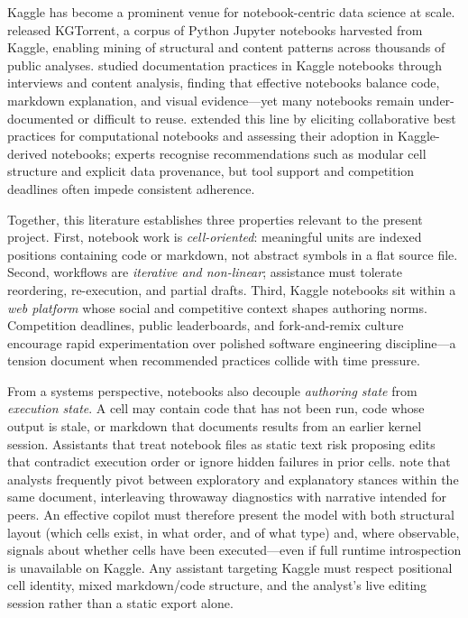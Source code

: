 Kaggle has become a prominent venue for notebook-centric data science at scale. \textcite{quaranta2021kgtorrent} released KGTorrent, a corpus of Python Jupyter notebooks harvested from Kaggle, enabling mining of structural and content patterns across thousands of public analyses. \textcite{wang2021welldocumented} studied documentation practices in Kaggle notebooks through interviews and content analysis, finding that effective notebooks balance code, markdown explanation, and visual evidence---yet many notebooks remain under-documented or difficult to reuse. \textcite{quaranta2022bestpractices} extended this line by eliciting collaborative best practices for computational notebooks and assessing their adoption in Kaggle-derived notebooks; experts recognise recommendations such as modular cell structure and explicit data provenance, but tool support and competition deadlines often impede consistent adherence.

Together, this literature establishes three properties relevant to the present project. First, notebook work is \emph{cell-oriented}: meaningful units are indexed positions containing code or markdown, not abstract symbols in a flat source file. Second, workflows are \emph{iterative and non-linear}; assistance must tolerate reordering, re-execution, and partial drafts. Third, Kaggle notebooks sit within a \emph{web platform} whose social and competitive context shapes authoring norms. Competition deadlines, public leaderboards, and fork-and-remix culture encourage rapid experimentation over polished software engineering discipline---a tension \textcite{quaranta2022bestpractices} document when recommended practices collide with time pressure.

From a systems perspective, notebooks also decouple \emph{authoring state} from \emph{execution state}. A cell may contain code that has not been run, code whose output is stale, or markdown that documents results from an earlier kernel session. Assistants that treat notebook files as static text risk proposing edits that contradict execution order or ignore hidden failures in prior cells. \textcite{rule2018exploration} note that analysts frequently pivot between exploratory and explanatory stances within the same document, interleaving throwaway diagnostics with narrative intended for peers. An effective copilot must therefore present the model with both structural layout (which cells exist, in what order, and of what type) and, where observable, signals about whether cells have been executed---even if full runtime introspection is unavailable on Kaggle. Any assistant targeting Kaggle must respect positional cell identity, mixed markdown/code structure, and the analyst's live editing session rather than a static export alone.

